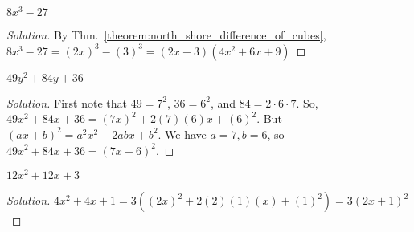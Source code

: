 \documentclass[crop=false,class=article,oneside]{standalone}
\begin{document}
        \begin{problem}
        $8x^{3}-27$
        \end{problem}
        \begin{proof}[Solution]
        By Thm.~\ref{theorem:north_shore_difference_of_cubes}, $8x^{3}-27=(2x)^{3}-(3)^{3}=(2x-3)(4x^{2}+6x+9)$
        \end{proof}
        \begin{problem}
        $49y^{2}+84y+36$
        \end{problem}
        \begin{proof}[Solution]
        First note that $49=7^{2}$, $36=6^{2}$, and $84=2\cdot 6\cdot 7$. So, $49x^{2}+84x+36=(7x)^{2}+2(7)(6)x+(6)^{2}$. But $(ax+b)^{2}=a^{2}x^{2}+2abx+b^{2}$. We have $a=7,b=6$, so $49x^{2}+84x+36=(7x+6)^{2}$.
        \end{proof}
        \begin{problem}
        $12x^{2}+12x+3$
        \end{problem}
        \begin{proof}[Solution]
        $4x^{2}+4x+1=3((2x)^{2}+2(2)(1)(x)+(1)^{2})=3(2x+1)^{2}$
        \end{proof}
\end{document}

